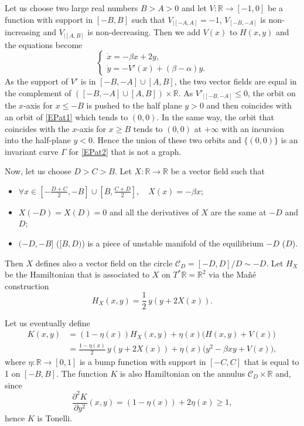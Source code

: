 \documentclass[10pt]{amsart}
\theoremstyle{definition}
\def\R{\mathbb{R}}
\begin{document}
Let us choose two large real numbers $B>A>0$ and let $V:\R\to [-1, 0]$ be a function with support in $[-B, B]$ such that $V_{|[-A, A]}=-1$, $V_{[-B, -A]}$ is non-increasing and $V_{|[A, B]}$ is non-decreasing. Then we add $V(x)$ to $H(x,y)$ and the equations become
\begin{equation}\label{EPat2}\begin{cases}
\dot x=-\beta x+2y,\\
\dot y=-V'(x)+(\beta-\alpha) y.
\end{cases}\end{equation}
As the support of $V'$ is in $[-B, -A]\cup [A,B]$, the two vector fields are equal in the complement of $([-B, -A]\cup [A, B])\times \R$. As $V'_{|[-B, -A]}\leq 0$, the orbit on the $x$-axis for $x\leq -B$ is pushed to the half plane $y>0$ and then coincides with an orbit of \eqref{EPat1} which tends to $(0, 0)$. In the same way, the orbit that coincides with the $x$-axis for $x\geq B$ tends to $(0, 0)$ at $+\infty$ with an incursion into the half-plane $y<0$. Hence the union of these two orbits and $\{ (0, 0)\}$ is an invariant curve $\Gamma$ for \eqref{EPat2} that is not a graph.

Now, let us choose $D>C>B$. Let $X:\R\to \R$ be a vector field such that
\begin{itemize}
\item $\forall x\in [-\frac{D+C}{2}, -B]\cup [B, \frac{C+D}{2}],\quad X(x)=-\beta x$;
\item $X(-D)=X(D)=0$ and all the derivatives of $X$ are the same at $-D$ and $D$;
\item $(-D, -B]$ (\resp $[B, D)$) is a piece of unstable manifold of the equilibrium $-D$ (\resp $D$).
\end{itemize}
Then $X$ defines also a vector field on the circle ${\mathcal C}_D=[-D, D]/D\sim -D$. Let $H_X$ be the Hamiltonian that is associated to $X$ on $T^*\R=\R^2$ via the Mañé construction
\[
H_X(x, y)=\frac{1}{2}\,y(y+2X(x)).
\]

Let us eventually define
\begin{align*}
K(x,y)&=(1-\eta (x))H_X(x,y)+\eta(x)\big(H(x,y)+V(x)\big)
\\
&=\frac{1-\eta (x)}{2}\,y(y+2X(x))+\eta(x)\big(y^2-\beta xy+V(x)\big),
\end{align*}
where $\eta:\R\to [0, 1]$ is a bump function with support in $[-C, C]$ that is equal to 1 on $[-B, B]$. The function $K$ is also Hamiltonian on the annulus $ {\mathcal C}_D\times \R$ and, since
\[
\frac{\partial^2K}{\partial y^2}(x, y)=(1-\eta(x))+2\eta(x)\geq 1,
\]
hence $K$ is Tonelli.
\end{document}
